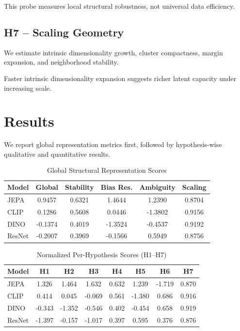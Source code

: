 \documentclass[10pt,twocolumn]{article}
\begin{document}
This probe measures local structural robustness, not universal data efficiency.

\subsection{H7 -- Scaling Geometry}
We estimate intrinsic dimensionality growth, cluster compactness, margin expansion, and neighborhood stability.

Faster intrinsic dimensionality expansion suggests richer latent capacity under increasing scale.
\section{Results}
We report global representation metrics first, followed by hypothesis-wise qualitative and quantitative results.

\begin{table}[H]
\centering
\caption{Global Structural Representation Scores}
\small
\begin{tabular}{lccccc}
\toprule
Model & Global & Stability & Bias Res. & Ambiguity & Scaling \\
\midrule
JEPA & 0.9457 & 0.6321 & 1.4644 & 1.2390 & 0.8704 \\
CLIP & 0.1286 & 0.5608 & 0.0446 & -1.3802 & 0.9156 \\
DINO & -0.1374 & 0.4019 & -1.3524 & -0.4537 & 0.9192 \\
ResNet & -0.2007 & 0.3969 & -0.1566 & 0.5949 & 0.8756 \\
\bottomrule
\end{tabular}
\end{table}

\begin{table}[H]
\centering
\caption{Normalized Per-Hypothesis Scores (H1--H7)}
\small
\begin{tabular}{l@{\hskip 0.1in}c@{\hskip 0.1in}c@{\hskip 0.1in}c@{\hskip 0.1in}c@{\hskip 0.1in}c@{\hskip 0.1in}c@{\hskip 0.1in}c}
\toprule
Model & H1 & H2 & H3 & H4 & H5 & H6 & H7 \\
\midrule
JEPA & 1.326 & 1.464 & 1.632 & 0.632 & 1.239 & -1.719 & 0.870 \\
CLIP & 0.414 & 0.045 & -0.069 & 0.561 & -1.380 & 0.686 & 0.916 \\
DINO & -0.343 & -1.352 & -0.546 & 0.402 & -0.454 & 0.658 & 0.919 \\
ResNet & -1.397 & -0.157 & -1.017 & 0.397 & 0.595 & 0.376 & 0.876 \\
\bottomrule
\end{tabular}
\end{table}
\end{document}
